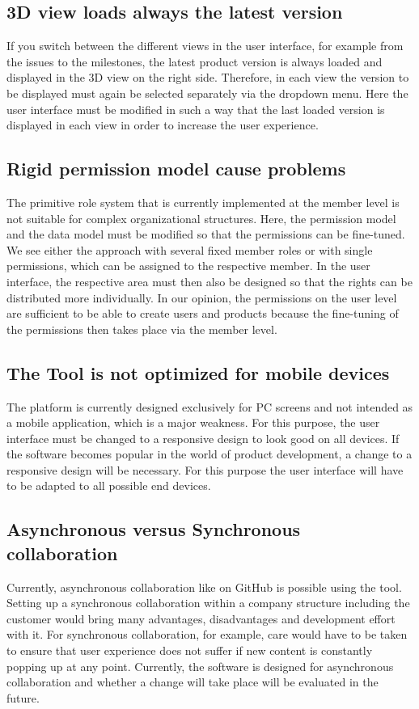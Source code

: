 \subsection*{3D view loads always the latest version}
If you switch between the different views in the user interface, for example from the issues to the milestones, the latest product version is always loaded and displayed in the 3D view on the right side. Therefore, in each view the version to be displayed must again be selected separately via the dropdown menu. Here the user interface must be modified in such a way that the last loaded version is displayed in each view in order to increase the user experience.

\subsection*{Rigid permission model cause problems}
The primitive role system that is currently implemented at the member level is not suitable for complex organizational structures. Here, the permission model and the data model must be modified so that the permissions can be fine-tuned. We see either the approach with several fixed member roles or with single permissions, which can be assigned to the respective member. In the user interface, the respective area must then also be designed so that the rights can be distributed more individually. In our opinion, the permissions on the user level are sufficient to be able to create users and products because the fine-tuning of the permissions then takes place via the member level.

\subsection*{The Tool is not optimized for mobile devices}
The platform is currently designed exclusively for PC screens and not intended as a mobile application, which is a major weakness. For this purpose, the user interface must be changed to a responsive design to look good on all devices. If the software becomes popular in the world of product development, a change to a responsive design will be necessary. For this purpose the user interface will have to be adapted to all possible end devices.


\subsection*{Asynchronous versus Synchronous collaboration}
Currently, asynchronous collaboration like on GitHub is possible using the tool. Setting up a synchronous collaboration within a company structure including the customer would bring many advantages, disadvantages and development effort with it. For synchronous collaboration, for example, care would have to be taken to ensure that user experience does not suffer if new content is constantly popping up at any point. Currently, the software is designed for asynchronous collaboration and whether a change will take place will be evaluated in the future.



